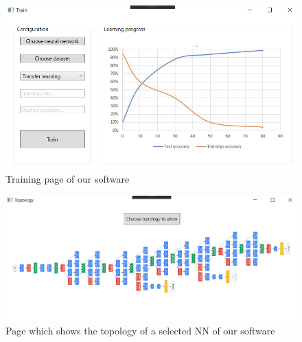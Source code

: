 \documentclass[parskip=full]{scrartcl}
\begin{document}
\begin{figure}[htb!]\centering
\includegraphics[width=\textwidth]{TrainGUI}
\caption{Training page of our software}
\end{figure}
\begin{figure}[htb!]
\centering
\includegraphics[width=\textwidth]{TopoGUI}
\caption{Page which shows the topology of a selected NN of our software}
\end{figure}
\newpage
\printnoidxglossaries
\end{document}
